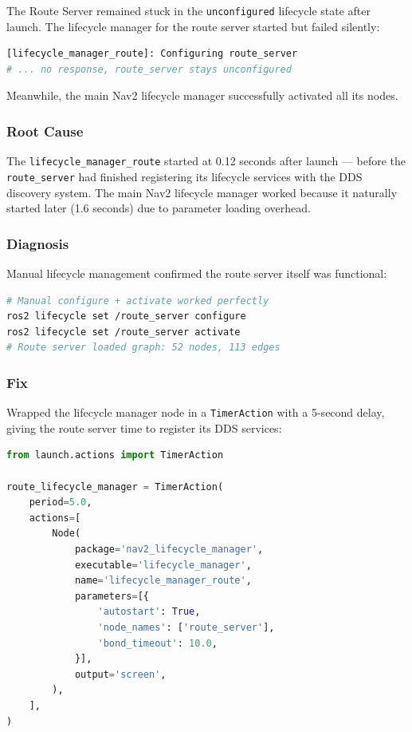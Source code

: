 \documentclass[11pt,a4paper]{article}
\begin{document}
The Route Server remained stuck in the \texttt{unconfigured} lifecycle state after launch. The lifecycle manager for the route server started but failed silently:

\begin{lstlisting}[language=bash]
[lifecycle_manager_route]: Configuring route_server
# ... no response, route_server stays unconfigured
\end{lstlisting}

Meanwhile, the main Nav2 lifecycle manager successfully activated all its nodes.

\subsubsection*{Root Cause}

The \texttt{lifecycle\_manager\_route} started at 0.12 seconds after launch --- before the \texttt{route\_server} had finished registering its lifecycle services with the DDS discovery system. The main Nav2 lifecycle manager worked because it naturally started later (1.6 seconds) due to parameter loading overhead.

\subsubsection*{Diagnosis}

Manual lifecycle management confirmed the route server itself was functional:

\begin{lstlisting}[language=bash]
# Manual configure + activate worked perfectly
ros2 lifecycle set /route_server configure
ros2 lifecycle set /route_server activate
# Route server loaded graph: 52 nodes, 113 edges
\end{lstlisting}

\subsubsection*{Fix}

Wrapped the lifecycle manager node in a \texttt{TimerAction} with a 5-second delay, giving the route server time to register its DDS services:

\begin{lstlisting}[language=python,caption={navigation.launch.py --- TimerAction delay}]
from launch.actions import TimerAction

route_lifecycle_manager = TimerAction(
    period=5.0,
    actions=[
        Node(
            package='nav2_lifecycle_manager',
            executable='lifecycle_manager',
            name='lifecycle_manager_route',
            parameters=[{
                'autostart': True,
                'node_names': ['route_server'],
                'bond_timeout': 10.0,
            }],
            output='screen',
        ),
    ],
)
\end{lstlisting}
\end{document}

